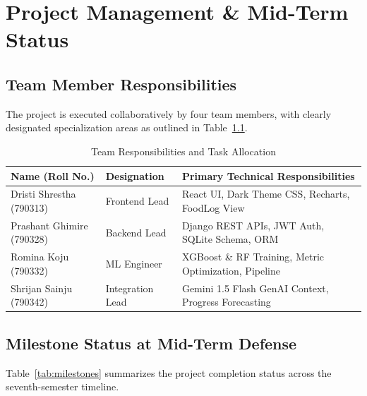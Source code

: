 \documentclass[12pt,a4paper]{report}
\begin{document}
\chapter{Project Management \& Mid-Term Status}

\section{Team Member Responsibilities}

The project is executed collaboratively by four team members, with clearly designated specialization areas as outlined in Table~\ref{tab:team}.

\begin{table}[htbp]
\centering
\caption{Team Responsibilities and Task Allocation}
\label{tab:team}
\begin{tabular}{lll}
\toprule
\textbf{Name (Roll No.)} & \textbf{Designation} & \textbf{Primary Technical Responsibilities} \\
\midrule
Dristi Shrestha (790313)  & Frontend Lead    & React UI, Dark Theme CSS, Recharts, FoodLog View \\
Prashant Ghimire (790328) & Backend Lead     & Django REST APIs, JWT Auth, SQLite Schema, ORM \\
Romina Koju (790332)      & ML Engineer      & XGBoost \& RF Training, Metric Optimization, Pipeline \\
Shrijan Sainju (790342)   & Integration Lead & Gemini 1.5 Flash GenAI Context, Progress Forecasting \\
\bottomrule
\end{tabular}
\end{table}

\section{Milestone Status at Mid-Term Defense}

Table~\ref{tab:milestones} summarizes the project completion status across the seventh-semester timeline.
\end{document}
